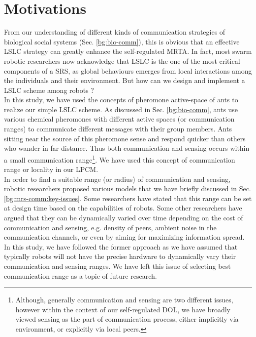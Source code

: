 \section{Motivations}
From our understanding of different kinds of communication strategies of biological social systems (Sec. \ref{bg:bio-comm}), this is obvious that an effective LSLC strategy can greatly enhance the self-regulated MRTA.  In fact, most swarm robotic researchers now acknowledge that LSLC is the one of the most critical components of a SRS, as global behaviours emerges from local interactions among the individuals and their environment. But how can we design and implement a LSLC scheme among robots ?\\
In this study, we have used the concepts of pheromone active-space of ants to realize our simple LSLC scheme. As discussed in Sec. \ref{bg:bio-comm}, ants use various chemical pheromones with different active spaces (or communication ranges) to communicate different messages with their group members. Ants sitting near the source of this pheromone sense and respond quicker than others who wander in far distance. Thus both communication and sensing occurs within a small communication range\footnote{Although, generally communication and sensing are two different issues, however within the context of our self-regulated DOL, we have broadly viewed sensing as the part of communication process, either implicitly via environment, or explicitly via local peers.}. We have used this concept of communication range or locality in our LPCM.\\
In order to find a suitable  range (or radius) of communication and sensing,  robotic researchers proposed various models that we have briefly discussed in Sec. \ref{bg:mrs-comm:key-issues}. Some researchers have stated that this range can be set at design time based on the capabilities of robots. Some other researchers have argued that they can be dynamically varied over time depending on the  cost of communication and sensing, e.g. density of peers, ambient noise in the communication channels, or even by aiming for maximizing information spread. In this study, we have followed the former approach as we have assumed that typically robots will not have the precise hardware to dynamically vary their communication and sensing ranges. We have left this issue of selecting best communication range as a topic of future research.
